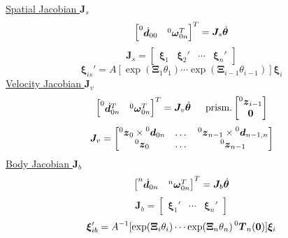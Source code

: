 \documentclass[twocolumn]{article}    %
\begin{document}
\newpage
\noindent\underline{Spatial Jacobian \(\bm{J}_s\)}
\begin{equation*}
    \begin{bmatrix}
        \prescript{0}{}{\dot{\bm{d}}_{00}} & \prescript{0}{}{\bm{\omega}}_{0n}^T
    \end{bmatrix}^T =  \bm{J}_s \dot{\bm{\theta}} 
\end{equation*}
\begin{equation*}
    \bm{J}_s = \begin{bmatrix}
        \bm{\xi}_1 & \bm{\xi}_2' & \cdots & \bm{\xi}_n'
    \end{bmatrix}
\end{equation*}
\begin{equation*}
    \bm{\xi}_{is}' = A[\operatorname{exp}(\bm{\Xi}_1\theta_1)\cdots \operatorname{exp}(\bm{\Xi}_{i-1}\theta_{i-1})]\bm{\xi}_i
\end{equation*}
\noindent\underline{Velocity Jacobian \(\bm{J}_v\)}
\begin{equation*}
    \begin{bmatrix}
        \prescript{0}{}{\dot{\bm{d}}_{0n}^T} & \prescript{0}{}{\bm{\omega}}_{0n}^T
    \end{bmatrix}^T = \bm{J}_v\dot{\bm{\theta}} \hspace{15pt} \text{prism.}\begin{bmatrix}
        \prescript{0}{}{\bm{z}}_{i-1} \\ \bm{0}
    \end{bmatrix}
\end{equation*}
\begin{equation*}
    \bm{J}_v = \begin{bmatrix}
        \prescript{0}{}{\bm{z}}_0 \times \prescript{0}{}{\bm{d}}_{0n} & \dots & \prescript{0}{}{\bm{z}}_{n-1} \times \prescript{0}{}{\bm{d}}_{n-1,n}\\
        \prescript{0}{}{\bm{z}}_0 & \dots & \prescript{0}{}{\bm{z}}_{n-1}
    \end{bmatrix} 
\end{equation*}
\noindent\underline{Body Jacobian \(\bm{J}_b\)}
\begin{equation*}
    \begin{bmatrix}
        \prescript{n}{}{\dot{\bm{d}}_{0n}} & \prescript{n}{}{\bm{\omega}}_{0n}^T
    \end{bmatrix}^T = \bm{J}_b \dot{\bm{\theta}}
\end{equation*}
\begin{equation*}
    \bm{J}_b = \begin{bmatrix}
        \bm{\xi}_1' & \cdots & \bm{\xi}_n'
    \end{bmatrix}
\end{equation*}
\begin{equation*}
    \hspace{-1pt} \bm{\xi}_{ib}' = A^{-1}[\operatorname{exp}(\bm{\Xi}_i\theta_i)\cdots \operatorname{exp}(\bm{\Xi}_n\theta_n)\prescript{0}{}{\bm{T}}_n(\bm{0})]\bm{\xi}_i
\end{equation*}
\end{document}
